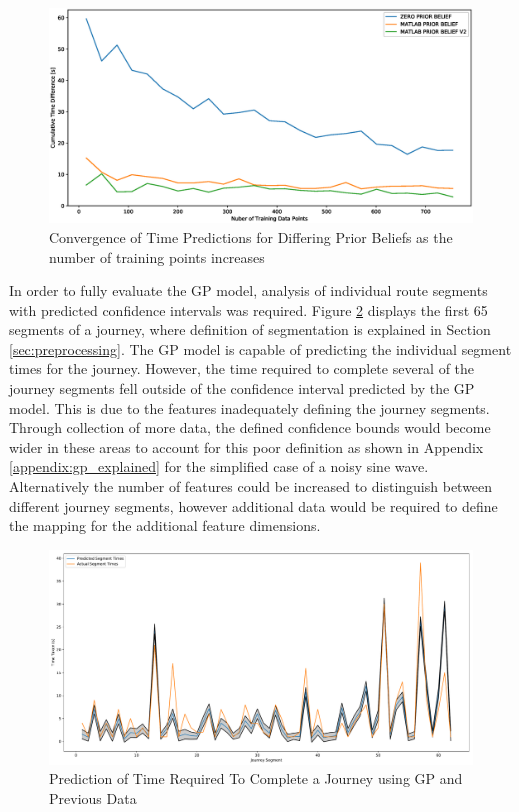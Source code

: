 \documentclass[a4paper, 10pt]{article}
\numberwithin{equation}{section}
\begin{document}
\begin{figure}[h!]
    \centering
    \includegraphics[width=\textwidth]{images/GP_Converge/individual_converge_cumulative_difference.eps}
    \caption{Convergence of Time Predictions for Differing Prior Beliefs as the number of training points increases}
    \label{fig:GP_converge_cum_tim}
\end{figure}


In order to fully evaluate the GP model, analysis of individual route segments with predicted confidence intervals was required. Figure \ref{fig:GP_journeysegments} displays the first 65 segments of a journey, where definition of segmentation is explained in Section \ref{sec:preprocessing}. The GP model is capable of predicting the individual segment times for the journey. However, the time required to complete several of the journey segments fell outside of the confidence interval predicted by the GP model. This is due to the features inadequately defining the journey segments. Through collection of more data, the defined confidence bounds would become wider in these areas to account for this poor definition as shown in Appendix \ref{appendix:gp_explained} for the simplified case of a noisy sine wave. Alternatively the number of features could be increased to distinguish between different journey segments, however additional data would be required to define the mapping for the additional feature dimensions.

\begin{figure}[h!]
    \centering
    \includegraphics[width=\textwidth]{images/full_riderandfleet_training_confidence.pdf}
    \caption{Prediction of Time Required To Complete a Journey using GP and Previous Data}
    \label{fig:GP_journeysegments}
\end{figure}
\end{document}
